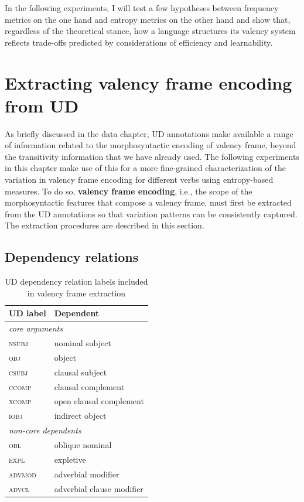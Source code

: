 In the following experiments, I will test a few hypotheses between frequency metrics on the one hand and entropy metrics on the other hand and show that, regardless of the theoretical stance, how a language structures its valency system reflects trade-offs predicted by considerations of efficiency and learnability.

\section{Extracting valency frame encoding from UD}\label{sec:valency-frame-encoding}

As briefly discussed in the data chapter, UD annotations make available a range of information related to the morphosyntactic encoding of valency frame, beyond the transitivity information that we have already used. The following experiments in this chapter make use of this for a more fine-grained characterization of the variation in valency frame encoding for different verbs using entropy-based measures. To do so, \textbf{valency frame encoding}, i.e., the scope of the morphosyntactic features that compose a valency frame, must first be extracted from the UD annotations so that variation patterns can be consistently captured. The extraction procedures are described in this section.
\subsection{Dependency relations}

\begin{table}
  \centering
  \begin{tabular}{ll}
    \toprule
    \textbf{UD label} & \textbf{Dependent} \\
    \midrule
    \multicolumn{2}{l}{\textit{core arguments}} \\
    \textsc{nsubj} & nominal subject \\
    \textsc{obj} & object \\
    \textsc{csubj} & clausal subject \\
    \textsc{ccomp} & clausal complement \\
    \textsc{xcomp}   & open clausal complement \\
    \textsc{iobj} & indirect object \\
    \midrule
    \multicolumn{2}{l}{\textit{non-core dependents}} \\
    \textsc{obl} & oblique nominal \\
    \textsc{expl} & expletive \\
    \textsc{advmod} & adverbial modifier \\
    \textsc{advcl} & adverbial clause modifier \\
    \bottomrule
  \end{tabular}
  \caption{UD dependency relation labels included in valency frame extraction}\label{tab:ud-dependent-labels}
\end{table}


